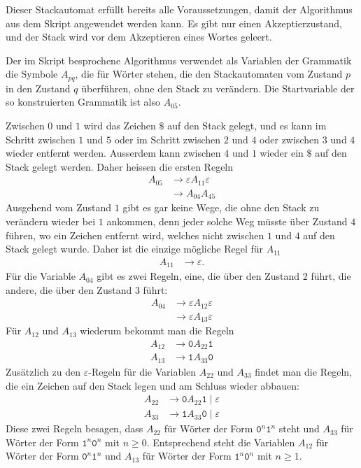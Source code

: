 \begin{loesung}
Dieser Stackautomat erfüllt bereits alle Voraussetzungen, damit
der Algorithmus aus dem Skript angewendet werden kann. Es gibt nur
einen Akzeptierzustand, und der Stack wird vor dem Akzeptieren
eines Wortes geleert.

Der im Skript besprochene Algorithmus verwendet als Variablen der
Grammatik die Symbole $A_{pq}$, die für Wörter stehen, die den
Stackautomaten vom Zustand $p$ in den Zustand $q$ überführen, ohne
den Stack zu verändern. Die Startvariable der so konstruierten Grammatik
ist also $A_{05}$.

Zwischen $0$ und $1$ wird das Zeichen $\texttt{\$}$ auf den Stack gelegt,
und es kann im Schritt zwischen $1$ und $5$ oder im Schritt zwischen $2$
und $4$ oder zwischen $3$ und $4$ wieder entfernt werden. Ausserdem
kann zwischen $4$ und $1$ wieder ein $\texttt{\$}$ auf den Stack gelegt
werden. Daher heissen die ersten Regeln
\begin{align*}
A_{05}&\to \varepsilon A_{11}\varepsilon \\
      &\to A_{04}A_{45}
\end{align*}
Ausgehend vom Zustand $1$ gibt es gar keine Wege, die ohne den Stack zu
verändern wieder bei $1$ ankommen, denn jeder solche Weg müsste über
Zustand $4$ führen, wo ein Zeichen entfernt wird, welches nicht zwischen
$1$ und $4$ auf den Stack gelegt wurde. Daher ist die einzige mögliche
Regel für $A_{11}$
\begin{align*}
A_{11}&\to\varepsilon.
\end{align*}
Für die Variable $A_{04}$ gibt es zwei Regeln, eine, die über den
Zustand $2$ führt, die andere, die über den Zustand $3$ führt:
\begin{align*}
A_{04}&\to \varepsilon A_{12}\varepsilon\\
      &\to \varepsilon A_{13}\varepsilon
\end{align*}
Für $A_{12}$ und $A_{13}$ wiederum bekommt man die Regeln
\begin{align*}
A_{12}&\to\texttt{0} A_{22}\texttt{1}\\
A_{13}&\to\texttt{1} A_{33}\texttt{0}
\end{align*}
Zusätzlich zu den $\varepsilon$-Regeln für die Variablen $A_{22}$ und $A_{33}$
findet man die Regeln, die ein Zeichen auf den Stack legen und am
Schluss wieder abbauen:
\begin{align*}
A_{22}&\to \texttt{0}A_{22}\texttt{1}\;|\;\varepsilon\\
A_{33}&\to \texttt{1}A_{33}\texttt{0}\;|\;\varepsilon
\end{align*}
Diese zwei Regeln besagen, dass $A_{22}$ für Wörter der Form
$\texttt{0}^n\texttt{1}^n$ steht und $A_{33}$ für Wörter der Form
$\texttt{1}^n\texttt{0}^n$ mit $n\ge 0$.
Entsprechend steht die Variablen $A_{12}$  für Wörter der Form
$\texttt{0}^n\texttt{1}^n$ und $A_{13}$ für Wörter der Form
$\texttt{1}^n\texttt{0}^n$ mit $n\ge 1$.


\end{loesung}
